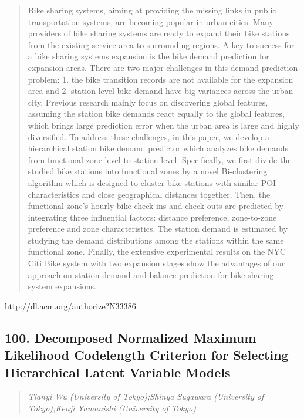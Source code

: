 \documentclass{article}
\begin{document}
\begin{quote}
Bike sharing systems, aiming at providing the missing links in public transportation systems, are becoming popular in urban cities. Many providers of bike sharing systems are ready to expand their bike stations from the existing service area to surrounding regions. A key to success for a bike sharing systems expansion is the bike demand prediction for expansion areas. There are two major challenges in this demand prediction problem: 1. the bike transition records are not available for the expansion area and 2. station level bike demand have big variances across the urban city. Previous research mainly focus on discovering global features, assuming the station bike demands react equally to the global features, which brings large prediction error when the urban area is large and highly diversified. To address these challenges, in this paper, we develop a hierarchical station bike demand predictor which analyzes bike demands from functional zone level to station level. Specifically, we first divide the studied bike stations into functional zones by a novel Bi-clustering algorithm which is designed to cluster bike stations with similar POI characteristics and close geographical distances together. Then, the functional zone’s hourly bike check-ins and check-outs are predicted by integrating three influential factors: distance preference, zone-to-zone preference and zone characteristics. The station demand is estimated by studying the demand distributions among the stations within the same functional zone. Finally, the extensive experimental results on the NYC Citi Bike system with two expansion stages show the advantages of our approach on station demand and balance prediction for bike sharing system expansions.
\end{quote}

\href{http://dl.acm.org/authorize?N33386}{http://dl.acm.org/authorize?N33386}

\subsection{100. Decomposed Normalized Maximum Likelihood Codelength Criterion for Selecting Hierarchical Latent Variable Models}

\begin{quote}
\footnotesize{\textit{Tianyi Wu (University of Tokyo);Shinya Sugawara (University of Tokyo);Kenji Yamanishi (University of Tokyo)}}

\end{quote}
\end{document}
